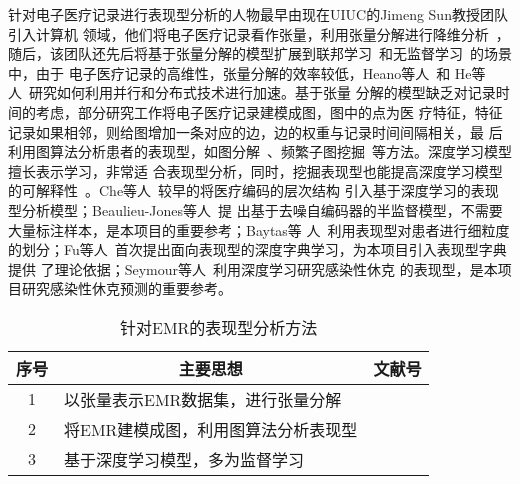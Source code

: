 针对电子医疗记录进行表现型分析的人物最早由现在UIUC的Jimeng Sun教授团队引入计算机
领域，他们将电子医疗记录看作张量，利用张量分解进行降维分析~，随后，该团队还先后将基于张量分解的模型扩展到联邦学习~和无监督学习~的场景中，由于
电子医疗记录的高维性，张量分解的效率较低，Heano等人~和
He等人~研究如何利用并行和分布式技术进行加速。基于张量
分解的模型缺乏对记录时间的考虑，部分研究工作将电子医疗记录建模成图，图中的点为医
疗特征，特征记录如果相邻，则给图增加一条对应的边，边的权重与记录时间间隔相关，最
后利用图算法分析患者的表现型，如图分解~、频繁子图挖掘~等方法。深度学习模型擅长表示学习，非常适
合表现型分析，同时，挖掘表现型也能提高深度学习模型的可解释性~。Che等人~较早的将医疗编码的层次结构
引入基于深度学习的表现型分析模型；Beaulieu-Jones等人~提
出基于去噪自编码器的半监督模型，不需要大量标注样本，是本项目的重要参考；Baytas等
人~利用表现型对患者进行细粒度的划分；Fu等人~首次提出面向表现型的深度字典学习，为本项目引入表现型字典提供
了理论依据；Seymour等人~利用深度学习研究感染性休克
的表现型，是本项目研究感染性休克预测的重要参考。

\begin{table}
    \renewcommand\arraystretch{1.5}
    \begin{small}
        \caption{针对EMR的表现型分析方法}
        \label{tab:phenotype}
        \begin{center}
            \begin{tabular}[c]{cll}
                \toprule
                \multicolumn{1}{c}{\textbf{序号}} & 
                \multicolumn{1}{c}{\textbf{主要思想}} &
                \multicolumn{1}{c}{\textbf{文献号}}\\
                \midrule
                1 & 以张量表示EMR数据集，进行张量分解 &
                \cite{ho2014extracting} \cite{kim2017federated}
                \cite{perros2018sustain} \cite{heano2018parallel} \cite{he2019distributed}
                \cite{perros2019temporal} \\
                2 & 将EMR建模成图，利用图算法分析表现型 & \cite{liu2015temporal}
                \cite{wang2015graph} \cite{xu2017predicting} \\
                3 & 基于深度学习模型，多为监督学习 & \cite{kale2015causal}
                \cite{che2015deep}
                \cite{beaulieu2016semi} \cite{cheng2016risk} 
                \cite{baytas2017patient} \cite{fu2019ddl} \cite{seymour2019derivation} \\
               \bottomrule
            \end{tabular}
        \end{center}
    \end{small}
\end{table}

